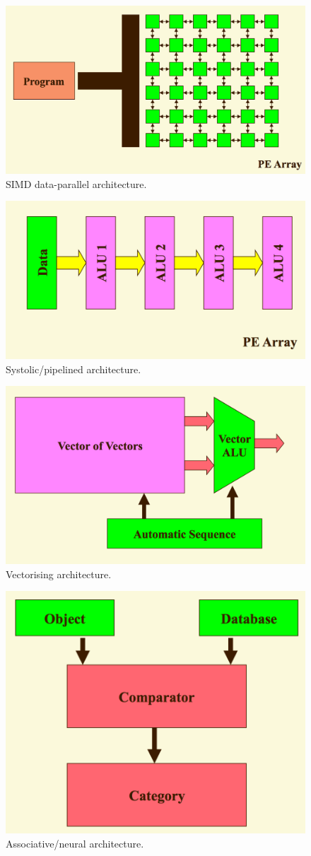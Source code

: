 \begin{figure}
\centering
\includegraphics[width=0.5\linewidth]{screenshot098}
\caption{SIMD data-parallel architecture.}
\label{fig:screenshot098}
\end{figure}

\begin{figure}
\centering
\includegraphics[width=0.5\linewidth]{screenshot099}
\caption{Systolic/pipelined architecture.}
\label{fig:screenshot099}
\end{figure}

\begin{figure}
\centering
\includegraphics[width=0.5\linewidth]{screenshot100}
\caption{Vectorising architecture.}
\label{fig:screenshot100}
\end{figure}

\begin{figure}
\centering
\includegraphics[width=0.5\linewidth]{screenshot101}
\caption{Associative/neural architecture.}
\label{fig:screenshot101}
\end{figure}

